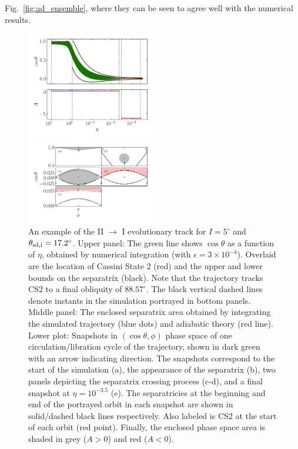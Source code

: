 \documentclass[
        fleqn,
        usenatbib,
    ]{mnras}
\newcommand*{\p}[1]{\left(#1\right)}
\begin{document}
Fig.~\ref{fig:ad_ensemble}, where they can be seen to agree well with the
numerical results.
\begin{figure}
    \centering
    \includegraphics[width=0.5\textwidth]{plots_diskdisp/3testo21.png}

    \includegraphics[width=0.5\textwidth]{plots_diskdisp/3testo21_subplots.png}
    \caption{An example of the II $\to$ I evolutionary track for $I = 5^\circ$
    and $\theta_{\rm sd, i} = 17.2^\circ$. Upper panel: The green line shows
    $\cos \theta$ as a function of $\eta$, obtained by numerical integration
    (with $\epsilon = 3 \times 10^{-4}$). Overlaid are the location of Cassini
    State 2 (red) and the upper and lower bounds on the separatrix (black). Note
    that the trajectory tracks CS2 to a final obliquity of $88.57^\circ$. The
    black vertical dashed lines denote instants in the simulation  portrayed in
    bottom panels. Middle panel: The enclosed separatrix area obtained by
    integrating the simulated trajectory (blue dots) and adiabatic theory (red
    line). Lower plot: Snapshots in $\p{\cos \theta, \phi}$ phase space of one
    circulation/libration cycle of the trajectory, shown in dark green with an
    arrow indicating direction. The snapshots correspond to the start of the
    simulation (a), the appearance of the separatrix (b), two panels depicting
    the separatrix crossing process (c-d), and a final snapshot at $\eta =
    10^{-3.5}$ (e). The separatricies at the beginning and end of the portrayed
    orbit in each snapshot are shown in solid/dashed black lines respectively.
    Also labeled is CS2 at the start of each orbit (red point). Finally, the
    enclosed phase space area is shaded in grey ($A > 0$) and red ($A <
    0$).}\label{fig:ad_21}
\end{figure}
\end{document}
